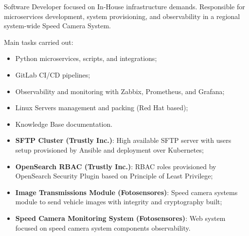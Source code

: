 \documentclass[10pt,a4paper]{altacv}
\begin{document}

Software Developer focused on In-House infrastructure demands. Responsible for microservices development, system provisioning, and observability in a regional system-wide Speed Camera System.

\bigskip

Main tasks carried out:

\bigskip

\begin{itemize}
    \item Python microservices, scripts, and integrations;
    \item GitLab CI/CD pipelines;
    \item Observability and monitoring with Zabbix, Prometheus, and Grafana;
    \item Linux Servers management and packing (Red Hat based);
    \item Knowledge Base documentation.
\end{itemize}


\begin{itemize}
    \item \textbf{SFTP Cluster (Trustly Inc.)}: High available SFTP server with users setup provisioned by Ansible and deployment over Kubernetes;
    \item \textbf{OpenSearch RBAC (Trustly Inc.)}: RBAC roles provisioned by OpenSearch Security Plugin based on Principle of Least Privilege;
    \item \textbf{Image Transmissions Module (Fotosensores)}: Speed camera systems module to send vehicle images with integrity and cryptography built;
    \item \textbf{Speed Camera Monitoring System (Fotosensores)}: Web system focused on speed camera system components observability.
\end{itemize}




\clearpage
\end{document}
